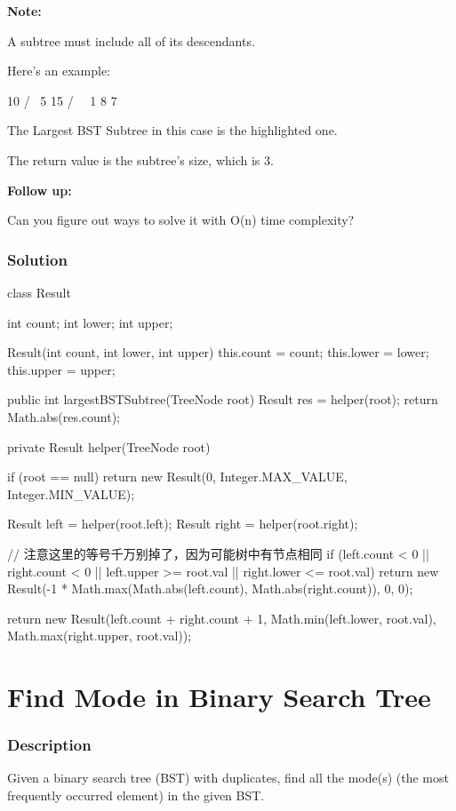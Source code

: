 \textbf{Note:}

A subtree must include all of its descendants.

Here's an example:
\begin{Code}
    10
    / \
   5  15
  / \   \
 1   8   7
\end{Code}

The Largest BST Subtree in this case is the highlighted one.

The return value is the subtree's size, which is 3.

\textbf{Follow up:}

Can you figure out ways to solve it with O(n) time complexity?

\subsubsection{Solution}

\begin{Code}
class Result {
    int count;
    int lower;
    int upper;

    Result(int count, int lower, int upper) {
        this.count = count;
        this.lower = lower;
        this.upper = upper;
    }
}

public int largestBSTSubtree(TreeNode root) {
    Result res = helper(root);
    return Math.abs(res.count);
}

private Result helper(TreeNode root) {
    if (root == null) {
        return new Result(0, Integer.MAX_VALUE, Integer.MIN_VALUE);
    }

    Result left = helper(root.left);
    Result right = helper(root.right);

    // 注意这里的等号千万别掉了，因为可能树中有节点相同
    if (left.count < 0 || right.count < 0 || left.upper >= root.val || right.lower <= root.val) {
        return new Result(-1 * Math.max(Math.abs(left.count), Math.abs(right.count)), 0, 0);
    }

    return new Result(left.count + right.count + 1, Math.min(left.lower, root.val), Math.max(right.upper, root.val));
}
\end{Code}

\newpage

\section{Find Mode in Binary Search Tree} %

\subsubsection{Description}
Given a binary search tree (BST) with duplicates, find all the mode(s) (the most frequently occurred element) in the given BST.


